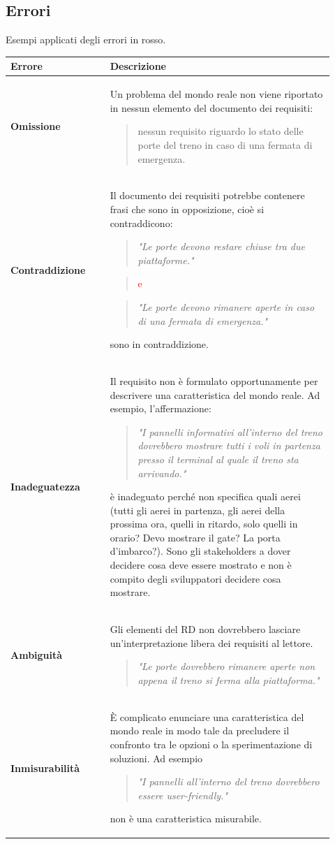 \documentclass[italian]{article}
\begin{document}
			\subsection{Errori}
		Esempi applicati degli errori in rosso.
		\begin{longtable}{|m{0.29\linewidth}|m{0.63\linewidth}|}
			\hline
			\textbf{Errore} & \textbf{Descrizione}\\
			\hline
			\textbf{Omissione} & Un problema del mondo reale non viene riportato in nessun elemento del documento dei requisiti:
			\begin{verse}
				 nessun requisito riguardo lo stato delle porte del treno in caso di una fermata di emergenza.
			\end{verse}\\
			\hline
			\textbf{Contraddizione} & Il documento dei requisiti potrebbe contenere frasi che sono in opposizione, cioè si contraddicono:  \begin{verse}
				\textit{"Le porte devono restare chiuse tra due piattaforme."}
			\end{verse}
			\begin{verse}
				\textcolor{red}{ e }
			\end{verse}
			\begin{verse}
				\textit{"Le porte devono rimanere aperte in caso di una fermata di emergenza."}
			\end{verse}
			sono in contraddizione.\\
			\hline
			\textbf{Inadeguatezza} & Il requisito non è formulato opportunamente per descrivere una caratteristica del mondo reale. Ad esempio, l'affermazione:
			\begin{verse}
				\textit{"I pannelli informativi all'interno del treno dovrebbero mostrare tutti i voli in partenza presso il terminal al quale il treno sta arrivando."}
			\end{verse}
			è inadeguato perché non specifica quali aerei (tutti gli aerei in partenza, gli aerei della prossima ora, quelli in ritardo, solo quelli in orario? Devo mostrare il gate? La porta d'imbarco?). Sono gli stakeholders a dover decidere cosa deve essere mostrato e non è compito degli sviluppatori decidere cosa mostrare.\\
			\hline
			\textbf{Ambiguità} & Gli elementi del RD non dovrebbero lasciare un'interpretazione libera dei requisiti al lettore.
			\begin{verse}
				\textit{"Le porte dovrebbero rimanere aperte non appena il treno si ferma alla piattaforma."}
			\end{verse}\\
			\hline
			\textbf{Inmisurabilità} & È complicato enunciare una caratteristica del mondo reale in modo tale da precludere il confronto tra le opzioni o la sperimentazione di soluzioni. Ad esempio
			\begin{verse}
				\textit{"I pannelli all'interno del treno dovrebbero essere user-friendly."}
			\end{verse}
			non è una caratteristica misurabile.
			\\
			\hline
		\end{longtable}
\end{document}
